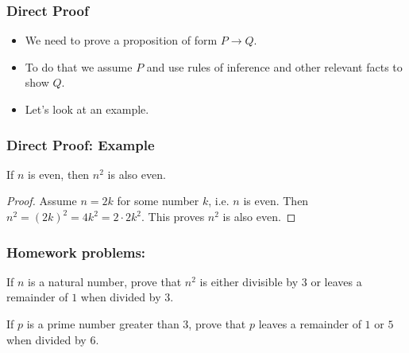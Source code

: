 \begin{frame}
    \frametitle{Direct Proof}
  
    \begin{itemize}
    \item We need to prove a proposition of form $P \longrightarrow Q$.
    \item To do that we assume $P$ and use rules of inference and other relevant facts to show $Q$.
    \item Let's look at an example.
    \end{itemize}
  
  \end{frame}
  
  \begin{frame}
    \frametitle{Direct Proof: Example}
  
    \begin{prop}
      If $n$ is even, then $n^2$ is also even.
    \end{prop}
    \begin{proof}
      Assume $n = 2k$ for some number $k$, i.e. $n$ is even. Then $n^2 = (2k)^2 = 4 k^2 = 2 \cdot 2k^2$. This proves $n^2$ is also even.
    \end{proof}
  
  \end{frame}
  
  
  \begin{frame}
    \frametitle{Homework problems:}
  
   \begin{prop}
      If $n$ is a natural number, prove that $n^2$ is either divisible by $3$ or leaves a remainder of $1$ when divided by $3$.
    \end{prop}
   
     \begin{prop}
      If $p$ is a prime number greater than $3$, prove that $p$ leaves a remainder of $1$ or $5$ when divided by $6$.
    \end{prop}
  
  \end{frame}